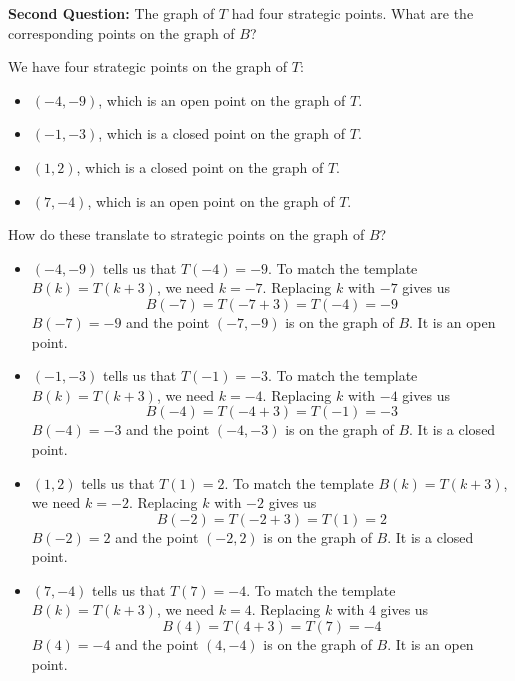 \documentclass{ximera}
\begin{document}
\textbf{\textcolor{purple!85!blue}{Second Question:}}  The graph of $T$ had four strategic points.  What are the corresponding points on the graph of $B$?


We have four strategic points on the graph of $T$: 

\begin{itemize}

\item $(-4, -9)$, which is an open point on the graph of $T$.
\item $(-1, -3)$, which is a closed point on the graph of $T$.
\item $(1, 2)$, which is a closed point on the graph of $T$.
\item $(7, -4)$, which is an open point on the graph of $T$.

\end{itemize}


How do these translate to strategic points on the graph of $B$?


\begin{itemize}

\item $(-4, -9)$ tells us that $T(-4) = -9$.   
To match the template $B(k) = T(k+3)$, we need $k=-7$.  Replacing $k$ with $-7$ gives us
\[ B(-7) = T(-7 + 3) = T(-4) = -9\]
$B(-7) = -9$ and the point $(-7, -9)$ is on the graph of $B$. It is an open point.


\item $(-1, -3)$ tells us that $T(-1) = -3$.   
To match the template $B(k) = T(k+3)$, we need $k=-4$.  Replacing $k$ with $-4$ gives us
\[ B(-4) = T(-4 + 3) = T(-1) = -3\]
$B(-4) = -3$ and the point $(-4, -3)$ is on the graph of $B$. It is a closed point.


\item $(1, 2)$ tells us that $T(1) = 2$.   
To match the template $B(k) = T(k+3)$, we need $k=-2$.  Replacing $k$ with $-2$ gives us
\[ B(-2) = T(-2 + 3) = T(1) = 2\]
$B(-2) = 2$ and the point $(-2, 2)$ is on the graph of $B$. It is a closed point.


\item $(7, -4)$ tells us that $T(7) = -4$.   
To match the template $B(k) = T(k+3)$, we need $k=4$.  Replacing $k$ with $4$ gives us
\[ B(4) = T(4 + 3) = T(7) = -4\]
$B(4) = -4$ and the point $(4, -4)$ is on the graph of $B$. It is an open point.


\end{itemize}
\end{document}
